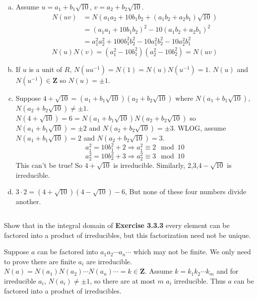 \begin{answer}
    \begin{enumerate}[(a)]
        \item Assume $u=a_{1}+b_{1}\sqrt{10}$, $v=a_{2}+b_{2}\sqrt{10}$.\[\begin{aligned}
            N(uv)&=N(a_{1}a_{2}+10b_{1}b_{2}+(a_{1}b_{2}+a_{2}b_{1})\sqrt{10})\\&=(a_{1}a_{1}+10b_{1}b_{2})^{2}-10(a_{1}b_{2}+a_{2}b_{1})^{2}\\&=a_{1}^{2}a_{2}^{2}+100b_{1}^{2}b_{2}^{2}-10a_{1}^{2}b_{2}^{2}-10a_{2}^{2}b_{1}^{2}
        \end{aligned}\]
        \[N(u)N(v)=(a_{1}^{2}-10b_{1}^{2})(a_{2}^{2}-10b_{2}^{2})=N(uv)\]
        \item If $u$ is a unit of $R$, $N(uu^{-1})=N(1)=N(u)N(u^{-1})=1$. $N(u)$ and $ N(u^{-1})\in \mathbf{Z}$ so $N(u)=\pm 1$.
        \item Suppose $4+\sqrt{10}=(a_{1}+b_{1}\sqrt{10})(a_{2}+b_{2}\sqrt{10})$ where $N(a_{1}+b_{1}\sqrt{10})$, $N(a_{2}+b_{2}\sqrt{10})\neq \pm 1$. $N(4+\sqrt{10})=6=N(a_{1}+b_{1}\sqrt{10})N(a_{2}+b_{2}\sqrt{10})$ so $N(a_{1}+b_{1}\sqrt{10})=\pm 2$ and $N(a_{2}+b_{2}\sqrt{10})=\pm 3$. WLOG, assume $N(a_{1}+b_{1}\sqrt{10})=2$ and $N(a_{2}+b_{2}\sqrt{10})=3$. \[a_{1}^{2}=10b_{1}^{2}+2\Rightarrow a_{1}^{2}\equiv 2\mod 10\]\[a_{2}^{2}=10b_{2}^{2}+3\Rightarrow a_{2}^{2}\equiv 3\mod 10\] This can't be true! So $4+\sqrt{10}$ is irreducible. Similarly, 2,3,$4-\sqrt{10}$ is irreducible.
        \item $3\cdot 2=(4+\sqrt{10})(4-\sqrt{10})-6$, But none of these four numbers divide another.
    \end{enumerate}
\end{answer}

$$ $$

\begin{ex}
    Show that in the integral domain of \textbf{Exercise 3.3.3} every element can be factored into a product of irreducibles, but this factorization need not be unique.
\end{ex}

\begin{answer}
    Suppose $a$ can be factored into $a_{1}a_{2}\cdots a_{n}\cdots$ which may not be finite. We only need to prove there are finite $a_{i}$ are irreducible. $N(a)=N(a_{1})N(a_{2})\cdots N(a_{n})\cdots=k\in\mathbf{Z}$. Assume $k=k_{1}k_{2}\cdots k_{m}$ and for irreducible $a_{i}$, $N(a_{i})\neq \pm 1$, so there are at most $m$ $a_{i}$ irreducible. Thus $a$ can be factored into a product of irreducibles.
\end{answer}

